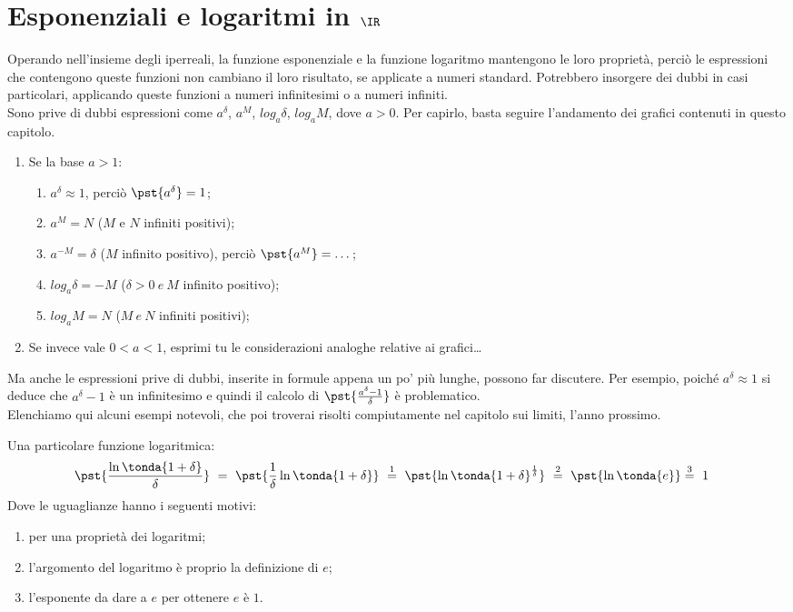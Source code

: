 \section{Esponenziali e logaritmi in \(\IR\)}
\label{sec:esplog_IR}
Operando nell'insieme degli iperreali, la funzione esponenziale e la funzione logaritmo mantengono le loro proprietà, perciò le espressioni che contengono
queste funzioni non cambiano il loro risultato, se applicate a numeri standard. Potrebbero insorgere dei dubbi in casi particolari, applicando queste funzioni a numeri infinitesimi o a numeri infiniti.\\
Sono prive di dubbi espressioni come \(a^\delta\), \(a^M\), \(log_a\delta\), \(log_a M\), dove \(a>0\). Per capirlo, basta seguire l'andamento dei grafici
contenuti in questo capitolo. 
\begin{enumerate}
 \item Se la base $a>1$:
  \begin{enumerate}[nosep]
   \item \(a^\delta \approx 1\), perciò \(\pst{a^\delta}=1\);
   \item \(a^M = N\) ($M$ e $N$ infiniti positivi);
   \item \(a^{-M} = \delta\) ($M$ infinito positivo), perciò 
   \(\pst{a^M}=\dots\);
   \item $log_a \delta= -M$ ($\delta >0 ~ e ~ M$ infinito positivo);
   \item $log_a M= N$ ($M ~ e ~ N$ infiniti positivi);
  \end{enumerate}
 \item Se invece vale $0<a<1$, esprimi tu le considerazioni analoghe relative ai grafici\dots
\end{enumerate}

Ma anche le espressioni prive di dubbi, inserite in formule appena un po' più lunghe, possono far discutere. Per esempio, poiché 
\(a^\delta \approx 1\) si deduce che \(a^\delta -  1\) è un infinitesimo e quindi il calcolo di $\pst{\frac{a^\delta -  1}{\delta}}$ è problematico.\\
Elenchiamo qui alcuni esempi notevoli, che poi troverai risolti compiutamente nel capitolo sui limiti, l'anno prossimo.\\

\begin{esempio}
\label{esempio:ln}
Una particolare funzione logaritmica:
\begin{align*}
 &\pst{\dfrac{\ln\tonda{1+\delta}}{\delta}}~ = ~  
 \pst{\frac{1}{\delta}\ln\tonda{1+\delta}} ~\stackrel{1}{=} ~
 \pst{\ln\tonda{1+\delta}^\frac{1}{\delta}}
~ \stackrel{2}{=} ~
\pst{\ln\tonda{e}} \stackrel{3}{=} ~ 1
\end{align*}
Dove le uguaglianze hanno i seguenti motivi:
\begin{enumerate} [nosep]
 \item per una proprietà dei logaritmi;
 \item l'argomento del logaritmo è proprio la definizione di \(e\);
 \item l'esponente da dare a \(e\) per ottenere \(e\) è \(1\).
\end{enumerate}
\end{esempio}

